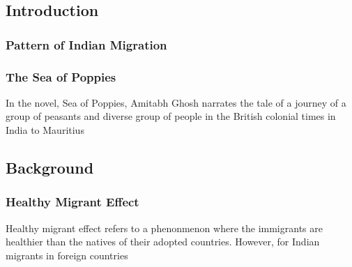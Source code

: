 \subsection{Introduction}

\subsubsection{Pattern of Indian Migration}

\subsubsection{The Sea of Poppies}
In the novel, Sea of Poppies, Amitabh Ghosh narrates the tale of a journey of a group of peasants and diverse group of people in the British colonial times in India to Mauritius \cite{ghosh2008sea}

\subsection{Background}

\subsubsection{Healthy Migrant Effect}

Healthy migrant effect refers to a phenonmenon where the immigrants are healthier than the natives of their adopted countries. However, for Indian migrants in foreign countries
    